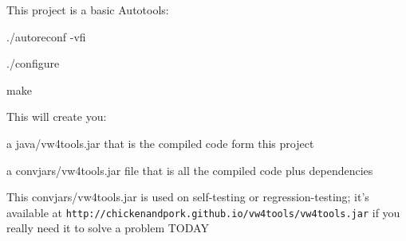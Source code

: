 This project is a basic Autotools\+:
\begin{DoxyEnumerate}
\item ./autoreconf -\/vfi
\item ./configure
\item make
\end{DoxyEnumerate}

This will create you\+:
\begin{DoxyItemize}
\item a java/vw4tools.\+jar that is the compiled code form this project
\item a convjars/vw4tools.\+jar file that is all the compiled code plus dependencies
\end{DoxyItemize}

This convjars/vw4tools.\+jar is used on self-\/testing or regression-\/testing; it's available at {\tt http\+://chickenandpork.\+github.\+io/vw4tools/vw4tools.\+jar} if you really need it to solve a problem T\+O\+D\+A\+Y 